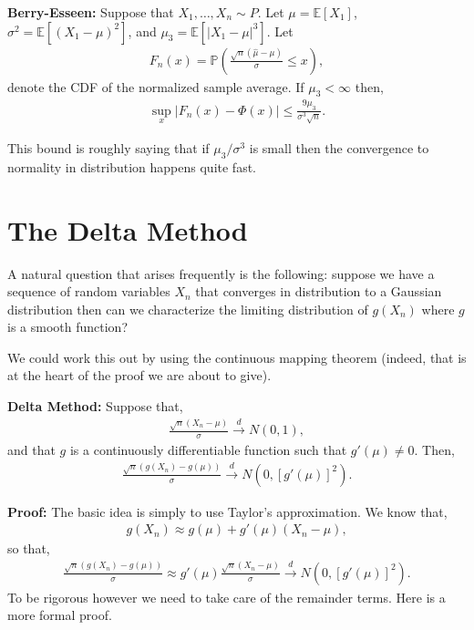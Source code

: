 \documentclass[twoside,12pt]{article}
\newcommand{\cdist}{\overset{d}{\rightarrow}}
\begin{document}
{\bf Berry-Esseen: } Suppose that $X_1,\ldots,X_n \sim P$. Let $\mu = \mathbb{E}[X_1]$, $\sigma^2 = \mathbb{E}[(X_1 - \mu)^2]$, and $\mu_3 = \mathbb{E}[|X_1 - \mu|^3].$ 
Let 
\begin{align*}
F_n(x) = \mathbb{P}\left( \frac{\sqrt{n} (\widehat{\mu} - \mu)}{\sigma} \leq x \right),
\end{align*}
denote the CDF of the normalized sample average. 
If $\mu_3 < \infty$ then,
\begin{align*}
\sup_{x} | F_n(x) - \Phi(x)| \leq \frac{9 \mu_3}{\sigma^3 \sqrt{n}}.
\end{align*}

This bound is roughly saying that if $\mu_3/\sigma^3$ is small then the convergence to normality in distribution happens quite fast.


\section{The Delta Method}
A natural question that arises frequently is the following: suppose we have a sequence of random variables $X_n$ that converges in distribution to a Gaussian distribution then can we characterize the limiting distribution of $g(X_n)$ where $g$ is a smooth function?

We could work this out by using the continuous mapping theorem (indeed, that is at the heart of the proof we are about to give).

{\bf Delta Method: } Suppose that,
\begin{align*}
\frac{\sqrt{n} (X_n - \mu) }{\sigma} \cdist N(0,1),
\end{align*}
and that $g$ is a continuously differentiable function such that $g'(\mu) \neq 0$. Then,
\begin{align*}
\frac{\sqrt{n} (g(X_n) - g(\mu)) }{\sigma} \cdist N(0, [g'(\mu)]^2).
\end{align*}

{\bf Proof: } The basic idea is simply to use Taylor's approximation. We know that,
\begin{align*}
g(X_n) \approx g(\mu) + g'(\mu) (X_n - \mu),
\end{align*}
so that,
\begin{align*}
\frac{\sqrt{n} (g(X_n) - g(\mu))}{\sigma} \approx g'(\mu) \frac{ \sqrt{n} (X_n - \mu)}{\sigma} \cdist N(0, [g'(\mu)]^2).
\end{align*}
To be rigorous however we need to take care of the remainder terms. Here is a more formal proof.
\end{document}

